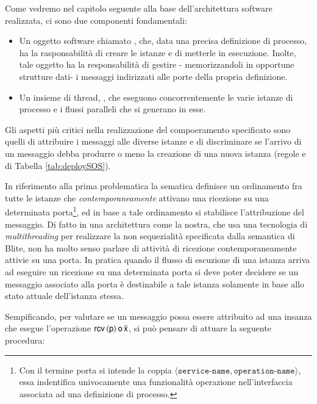 Come vedremo nel capitolo seguente alla base dell'architettura software
realizzata, ci sono due componenti fondamentali:

\begin{itemize}
  \item Un oggetto software chiamato , che, data una   
  precisa definizione di processo, ha la rasponsabilità di creare le istanze
  e di metterle in esecuzione. Inolte, tale oggetto ha la responsabilità di
  gestire - memorizzandoli in opportune strutture dati- i messaggi indirizzati alle porte
  della propria definizione.
  \item Un insieme di thread, , che eseguono concorrentemente
  le varie istanze di processo e i flussi paralleli che si generano in esse.
\end{itemize}

Gli aspetti più critici nella realizzazione del compoeramento specificato
sono quelli di attribuire i messaggi alle diverse istanze e di discriminare se
l'arrivo di un messaggio debba produrre o meno la creazione di una nuova
istanza (regole  e  di Tabella
\ref{tab:deploySOS}).

In riferimento alla prima problematica la sematica definisce un ordinamento fra
tutte le istanze che \emph{contemporaneamente} attivano una ricezione su una
determinata porta\footnote{Con il termine porta si intende la coppia $\langle
\texttt{service-name}, \texttt{operation-name} \rangle$, essa indentifica
univocamente una funzionalità operazione nell'interfaccia associata ad una
definizione di processo.}, ed in base a tale ordinamento si stabilisce
l'attribuzione del messaggio. Di fatto in una architettura come la nostra, che
usa una tecnologia di \emph{multithreading} per realizzare la non sequezialità
specificata dalla semantica di Blite, non ha molto senso parlare di attività di
ricezione contemporaneamente attivie su una porta. In pratica quando il
flusso di escuzione di una istanza arriva ad eseguire un ricezione su una
determinata porta si deve poter decidere se un messaggio associato alla porta è
destinabile a tale istanza solamente in base allo stato attuale dell'istanza
stessa.


Sempificando, per valutare se un messaggio possa essere attribuito ad una
insanza che esegue l'operazione
${\sf rcv}\,\langle {\sf p} \rangle\, {\sf o}\, \bar{{\sf x}}$, si può pensare di attuare la seguente
procedura:

